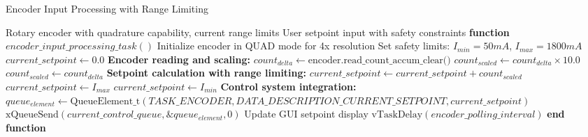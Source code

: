 \documentclass{article}
\begin{document}
\begin{algorithm}
\caption{Encoder Input Processing with Range Limiting}
\label{alg:encoder_input_processing}
\begin{algorithmic}[1]
\REQUIRE Rotary encoder with quadrature capability, current range limits
\ENSURE User setpoint input with safety constraints
\STATE \textbf{function} $encoder\_input\_processing\_task()$
\STATE Initialize encoder in QUAD mode for 4x resolution
\STATE Set safety limits: $I_{min} = 50mA$, $I_{max} = 1800mA$
\STATE $current\_setpoint \leftarrow 0.0$
\STATE
{}
    \STATE \textbf{Encoder reading and scaling:}
    \STATE $count_{delta} \leftarrow \text{encoder.read\_count\_accum\_clear()}$
        \STATE $count_{scaled} \leftarrow count_{delta} \times 10.0$ 
    \ELSE
        \STATE $count_{scaled} \leftarrow count_{delta}$ 
    \ENDIF
    \STATE
    \STATE \textbf{Setpoint calculation with range limiting:}
    \STATE $current\_setpoint \leftarrow current\_setpoint + count_{scaled}$
        \STATE $current\_setpoint \leftarrow I_{max}$ 
        \STATE $current\_setpoint \leftarrow I_{min}$ 
    \ENDIF
    \STATE
    \STATE \textbf{Control system integration:}
        \STATE $queue_{element} \leftarrow \text{QueueElement\_t}(TASK\_ENCODER, DATA\_DESCRIPTION\_CURRENT\_SETPOINT, current\_setpoint)$
        \STATE $\text{xQueueSend}(current\_control\_queue, \&queue_{element}, 0)$
        \STATE Update GUI setpoint display
    \ENDIF
    \STATE
    \STATE $\text{vTaskDelay}(encoder\_polling\_interval)$ 
\ENDWHILE
\STATE \textbf{end function}
\end{algorithmic}
\end{algorithm}
\end{document}
